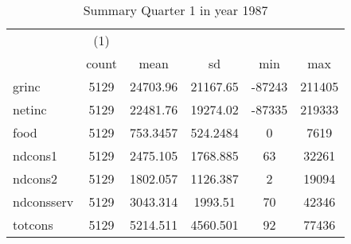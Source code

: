 \begin{table}[htbp]\centering
\def\sym#1{\ifmmode^{#1}\else\(^{#1}\)\fi}
\caption{Summary Quarter 1 in year 1987 \label{sum\_Q1\_y1987}}
\begin{tabular}{l*{1}{ccccc}}
\hline\hline
            &\multicolumn{1}{c}{(1)}&            &            &            &            \\
            &       count&        mean&          sd&         min&         max\\
\hline
grinc       &        5129&    24703.96&    21167.65&      -87243&      211405\\
netinc      &        5129&    22481.76&    19274.02&      -87335&      219333\\
food        &        5129&    753.3457&    524.2484&           0&        7619\\
ndcons1     &        5129&    2475.105&    1768.885&          63&       32261\\
ndcons2     &        5129&    1802.057&    1126.387&           2&       19094\\
ndconsserv  &        5129&    3043.314&     1993.51&          70&       42346\\
totcons     &        5129&    5214.511&    4560.501&          92&       77436\\
\hline\hline
\end{tabular}
\end{table}
